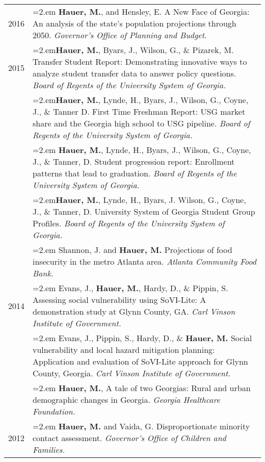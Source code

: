 \begin{tabularx}{\linewidth}{lX}
2016    & \hangindent=2.em \textbf{Hauer, M.}, and Hensley, E. A New Face of Georgia: An analysis of the state's population projections through 2050. \textit{Governor's Office of Planning and Budget}.\\
2015    & \hangindent=2.em\textbf{Hauer, M.}, Byars, J., Wilson, G., \& Pizarek, M. Transfer Student Report: Demonstrating innovative ways to analyze             student transfer data to answer policy questions. \textit{Board of Regents of the University System of Georgia.}\\
      & \hangindent=2.em\textbf{Hauer, M.}, Lynde, H., Byars, J., Wilson, G., Coyne, J., \& Tanner D. First Time Freshman Report: USG market share and     the Georgia high school to USG pipeline. \textit{Board of Regents of the University System of Georgia.}\\
       & \hangindent=2.em \textbf{Hauer, M.}, Lynde, H., Byars, J., Wilson, G., Coyne, J., \& Tanner, D. Student progression report: Enrollment patterns     that lead to graduation. \textit{Board of Regents of the University System of Georgia.}\\
       & \hangindent=2.em\textbf{Hauer, M.}, Lynde, H., Byars, J. Wilson, G., Coyne, J., \& Tanner, D. University System of Georgia Student Group         Profiles. \textit{Board of Regents of the University System of Georgia.}\\
       & \hangindent=2.em Shannon, J. and \textbf{Hauer, M.} Projections of food insecurity in the metro Atlanta area. \textit{Atlanta Community Food     Bank.}\\
2014     & \hangindent=2.em Evans, J., \textbf{Hauer, M.}, Hardy, D., \& Pippin, S. Assessing social vulnerability using SoVI-Lite: A demonstration study             at Glynn County, GA. \textit{Carl Vinson Institute of Government.}\\
       & \hangindent=2.em Evans, J., Pippin, S., Hardy, D., \& \textbf{Hauer, M.} Social vulnerability and local hazard mitigation planning: Application     and evaluation of SoVI-Lite approach for Glynn County, Georgia. \textit{Carl Vinson Institute of Government.}\\
       & \hangindent=2.em \textbf{Hauer, M.}, A tale of two Georgias: Rural and urban demographic changes in Georgia. \textit{Georgia Healthcare            Foundation.}\\
2012    & \hangindent=2.em \textbf{Hauer, M.} and Vaida, G. Disproportionate minority contact assessment. \textit{Governor's Office of Children and                  Families.}\\

\end{tabularx}
